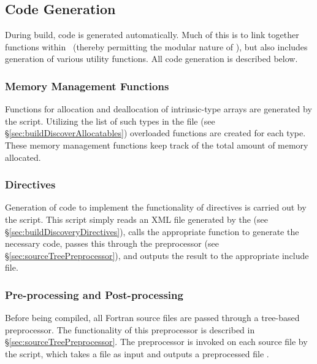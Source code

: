 \subsection{Code Generation}

During build, code is generated automatically. Much of this is to link together functions within \glc\ (thereby permitting the modular nature of \glc), but also includes generation of various utility functions. All code generation is described below.

\subsubsection{Memory Management Functions}\label{sec:buildGenerationMemory}

Functions for allocation and deallocation of intrinsic-type arrays are generated by the  script. Utilizing the list of such types in the  file (see \S\ref{sec:buildDiscoverAllocatables}) overloaded functions are created for each type. These memory management functions keep track of the total amount of memory allocated.

 
\subsubsection{Directives}\label{sec:codeBuildIncludeDirectives}

Generation of code to implement the functionality of  directives is carried out by the  script. This script simply reads an XML file generated by the  (see \S\ref{sec:buildDiscoveryDirectives}), calls the appropriate function to generate the necessary code, passes this through the preprocessor (see \S\ref{sec:sourceTreePreprocessor}), and outputs the result to the appropriate include file.

\subsubsection{Pre-processing and Post-processing}\label{sec:codeBuildPrePostProcess}

Before being compiled, all Fortran source files are passed through a tree-based preprocessor. The functionality of this preprocessor is described in \S\ref{sec:sourceTreePreprocessor}. The preprocessor is invoked on each source file by the  script, which takes a  file as input and outputs a preprocessed file .

